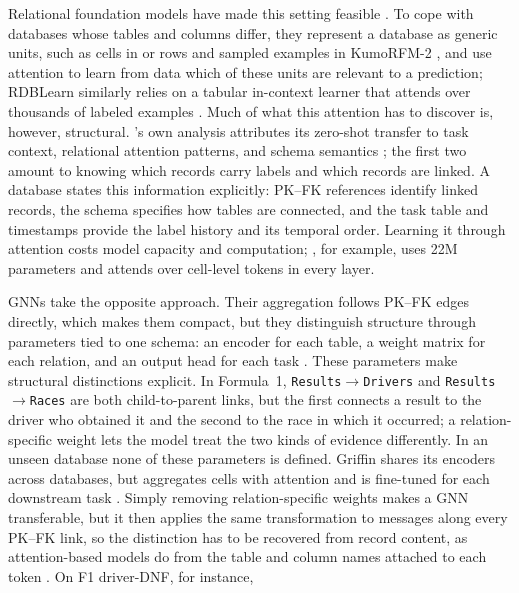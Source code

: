 Relational foundation models have made this setting feasible
\citep{ranjan2026rt,ranjan2026rtj,kothapalli2026plurel,hudovernik2026kumorfm2}.
To cope with databases whose tables and columns differ, they represent a
database as generic units, such as cells in \RT{} \citep{ranjan2026rt} or rows
and sampled examples in KumoRFM-2 \citep{hudovernik2026kumorfm2}, and use
attention to learn from data which of these units are relevant to a
prediction; RDBLearn similarly relies on a tabular in-context learner that
attends over thousands of labeled examples \citep{xu2026rdblearn}. Much of
what this attention has to discover is, however, structural. \RT{}'s own
analysis attributes its zero-shot transfer to task context, relational
attention patterns, and schema semantics \citep{ranjan2026rt}; the first two
amount to knowing which records carry labels and which records are linked.
A database states this information explicitly: PK--FK references identify
linked records, the schema specifies how tables are connected, and the task
table and timestamps provide the label history and its temporal order.
Learning it through attention costs model capacity and computation; \RT{},
for example, uses 22M parameters and attends over cell-level tokens in every
layer.

GNNs take the opposite approach. Their aggregation follows PK--FK edges
directly, which makes them compact, but they distinguish structure through
parameters tied to one schema: an encoder for each table, a weight matrix for
each relation, and an output head for each task
\citep{fey2024rdl,chen2025relgnn}. These parameters make structural
distinctions explicit. In Formula~1, \texttt{Results}$\rightarrow$\texttt{Drivers}
and \texttt{Results}$\rightarrow$\texttt{Races} are both child-to-parent links,
but the first connects a result to the driver who obtained it and the second
to the race in which it occurred; a relation-specific weight lets the model
treat the two kinds of evidence differently. In an unseen database none of
these parameters is defined. Griffin shares its encoders across databases, but
aggregates cells with attention and is fine-tuned for each downstream task
\citep{wang2025griffin}. Simply removing relation-specific weights makes a GNN
transferable, but it then applies the same transformation to messages along
every PK--FK link, so the distinction has to be recovered from record content,
as attention-based models do from the table and column names attached to each
token \citep{ranjan2026rt}.
On F1 driver-DNF, for instance,


